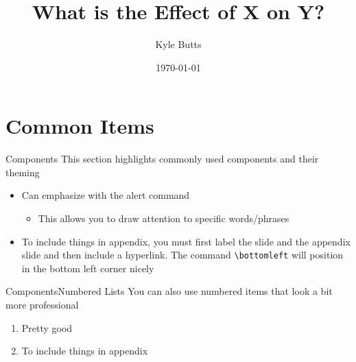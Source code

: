 \documentclass[aspectratio=169,t,11pt,table]{beamer}
\title{What is the Effect of X on Y?}
\date{\today}
\author{Kyle Butts}
\begin{document}
\begin{frame}
\maketitle

\end{frame}

\section{Common Items}

\begin{frame}{Components}\label{main1}
  This section highlights commonly used components and their theming

  \begin{itemize}
    \item Can emphasize with \alert{the alert command}
    
    \begin{itemize}
      \item This allows you to draw attention to specific words/phrases
    \end{itemize}
    
    \item To include things in appendix, you must first label the slide and the appendix slide and then include a hyperlink. The command \texttt{\textbackslash bottomleft} will position in the bottom left corner nicely
  \end{itemize}

\end{frame}


\begin{frame}{Components}{Numbered Lists}
  You can also use numbered items that look a bit more professional

  \begin{enumerate}
    \item Pretty good
    
    \item To include things in appendix
  \end{enumerate}
\end{frame}
\end{document}
